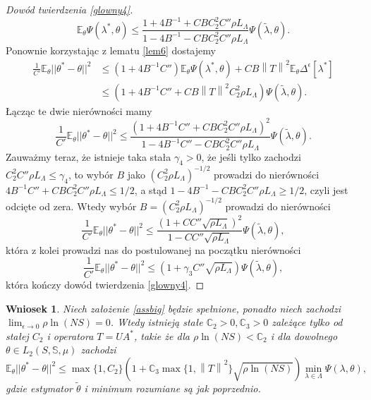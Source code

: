 \documentclass[man,mfiu]{mgrwms}
\newcommand{\norm}[1]{\left\lVert#1\right\rVert}
\newtheorem{wn}{Wniosek}[chapter]
\begin{document}
\begin{proof}[Dowód twierdzenia \ref{glowny4}]
\begin{displaymath}
\mathbb{E}_{\theta}\Psi(\lambda^*,\theta)\leq\frac{1+4B^{-1}+CBC_2^2C''\rho L_{\Lambda}}{1-4B^{-1}-CBC_2^2C''\rho L_{\Lambda}}\Psi(\tilde{\lambda},\theta).
\end{displaymath}
Ponownie korzystając z lematu \ref{lem6} dostajemy
\begin{displaymath}
\begin{split}
\frac{1}{C'}\mathbb{E}_{\theta}||\theta^*-\theta||^2&\leq (1+4B^{-1}C'')\mathbb{E}_{\theta}\Psi(\lambda^*,\theta)+CB\norm{T}^2\mathbb{E}_{\theta}\Delta^{\epsilon}[\lambda^*]\\
&\leq (1+4B^{-1}C''+CB\norm{T}^2C_2^2\rho L_{\Lambda})\Psi(\tilde{\lambda},\theta).
\end{split}
\end{displaymath}
Łącząc te dwie nierówności mamy
\begin{displaymath}
\frac{1}{C'}\mathbb{E}_{\theta}||\theta^*-\theta||^2\leq \frac{\left(1+4B^{-1}C''+CBC_2^2C''\rho L_{\Lambda}\right)^2}{1-4B^{-1}C''-CBC_2^2C''\rho L_{\Lambda}}\Psi(\tilde{\lambda},\theta).
\end{displaymath}
Zauważmy teraz, że istnieje taka stała $\gamma_4>0$, że jeśli tylko zachodzi $C_2^2C''\rho L_{\Lambda}\leq \gamma_4$, to wybór $B$ jako $(C_2^2\rho L_{\Lambda})^{-1/2}$ prowadzi do nierówności $4B^{-1}C''+CBC_2^2C''\rho L_{\Lambda}\leq 1/2$, a stąd $1-4B^{-1}-CBC_2^2C''\rho L_{\Lambda}\geq 1/2$, czyli jest odcięte od zera. Wtedy wybór $B=(C_2^2\rho L_{\Lambda})^{-1/2}$ prowadzi do nierówności
\begin{displaymath}
\frac{1}{C'}\mathbb{E}_{\theta}||\theta^*-\theta||^2\leq \frac{(1+CC''\sqrt{\rho L_{\Lambda}})^2}{1-CC''\sqrt{\rho L_{\Lambda}}}\Psi(\tilde{\lambda},\theta),
\end{displaymath}
która z kolei prowadzi nas do postulowanej na początku nierówności
\begin{displaymath}
\frac{1}{C'}\mathbb{E}_{\theta}||\theta^*-\theta||^2\leq (1+\gamma_3C''\sqrt{\rho L_{\Lambda}})\Psi(\tilde{\lambda},\theta),
\end{displaymath}
która kończy dowód twierdzenia \ref{glowny4}.
\end{proof}


\begin{wn}
Niech założenie \ref{assbig} będzie spełnione, ponadto niech zachodzi\\ $\lim_{\epsilon\to 0}\rho\ln(NS)=0$. Wtedy istnieją stałe $\mathbb{C}_2>0,\mathbb{C}_3>0$ zależące tylko od stałej $C_2$ i operatora $T=UA^*$, takie że dla $\rho\ln(NS)<\mathbb{C}_2$ i dla dowolnego $\theta\in L_2(S,\mathbb{S},\mu)$ zachodzi
\begin{displaymath}
\mathbb{E}_{\theta}||\theta^*-\theta||^2\leq \max\{1,C_2\}\left(1+\mathbb{C}_3\max\{1,\norm{T}^2\}\sqrt{\rho \ln(NS)}\right)\min_{\lambda\in \Lambda}\Psi(\lambda,\theta),
\end{displaymath}
gdzie estymator $\tilde{\theta}$ i minimum rozumiane są jak poprzednio.
\end{wn}
\end{document}
